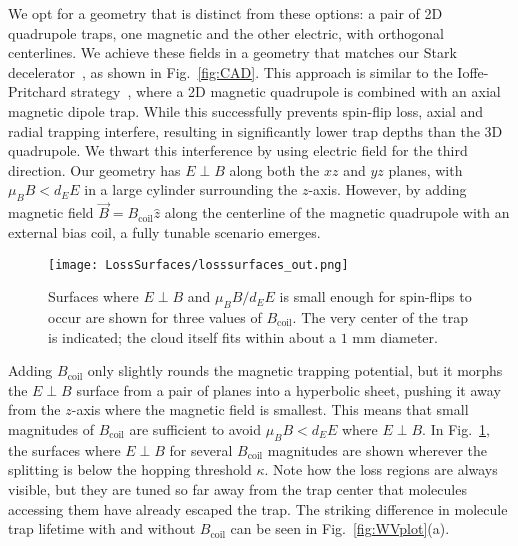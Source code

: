 \documentclass[%
 reprint,
groupedaddress,
 amsmath,amssymb,
 aps,
prl,
]{revtex4-1}
\newcommand{\epb}{{$E\!\perp\!B$}}
\begin{document}
We opt for a geometry that is distinct from these options: a pair of 2D quadrupole traps, one magnetic and the other electric, with orthogonal centerlines. We achieve these fields in a geometry that matches our Stark decelerator~\cite{Bochinski2003}, as shown in Fig.~\ref{fig:CAD}. This approach is similar to the Ioffe-Pritchard strategy~\cite{pritchard1983}, where a 2D magnetic quadrupole is combined with an axial magnetic dipole trap. While this successfully prevents spin-flip loss, axial and radial trapping interfere, resulting in significantly lower trap depths than the 3D quadrupole. We thwart this interference by using electric field for the third direction. Our geometry has \epb{} along both the $xz$ and $yz$ planes, with $\mu_BB < d_EE$ in a large cylinder surrounding the $z$-axis. However, by adding magnetic field $\vec{B}=B_\text{coil}\hat{z}$ along the centerline of the magnetic quadrupole with an external bias coil, a fully tunable scenario emerges. %


\begin{figure}[tb]
\texttt{[image: LossSurfaces/losssurfaces\_out.png]}%
\caption{
Surfaces where \epb{} and $\mu_BB/d_EE$ is small enough for spin-flips to occur are shown for three values of $B_\text{coil}$. The very center of the trap is indicated; the cloud itself fits within about a $1\text{ mm}$ diameter.
\label{fig:LSurfs}}
\end{figure}

Adding $B_\text{coil}$ only slightly rounds the magnetic trapping potential, but it morphs the \epb{} surface from a pair of planes into a hyperbolic sheet, pushing it away from the $z$-axis where the magnetic field is smallest. This means that small magnitudes of $B_\text{coil}$  are sufficient to avoid $\mu_BB< d_EE$ where \epb. In Fig.~\ref{fig:LSurfs}, the surfaces where \epb{} for several $B_\text{coil}$ magnitudes are shown wherever the splitting is below the hopping threshold $\kappa$. Note how the loss regions are always visible, but they are tuned so far away from the trap center that molecules accessing them have already escaped the trap. The striking difference in molecule trap lifetime with and without $B_\text{coil}$ can be seen in Fig.~\ref{fig:WVplot}(a).
\end{document}
